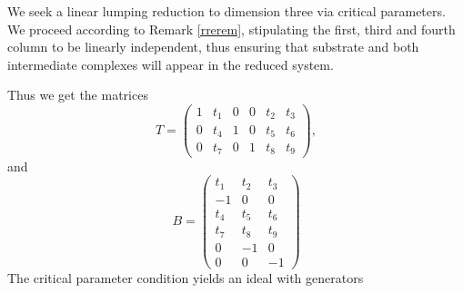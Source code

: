 \documentclass{article}
\begin{document}
We seek a linear lumping reduction to dimension three via critical parameters.
We proceed according to Remark \ref{rrerem}, stipulating the first, third and fourth column to be linearly independent, thus ensuring that substrate and both intermediate complexes will appear in the reduced system.


Thus we get the matrices
\[
T=\begin{pmatrix}
    1&t_1&0&0&t_2&t_3\\
    0&t_4&1&0&t_5&t_6\\
    0&t_7&0&1&t_8&t_9
\end{pmatrix},
\]
and 
\[
B=\begin{pmatrix}
    t_1&t_2&t_3\\
    -1&0&0\\
    t_4&t_5&t_6\\
    t_7&t_8&t_9\\
    0&-1&0\\
    0&0&-1
\end{pmatrix}
\]
The critical parameter condition yields an ideal with generators %
\end{document}
